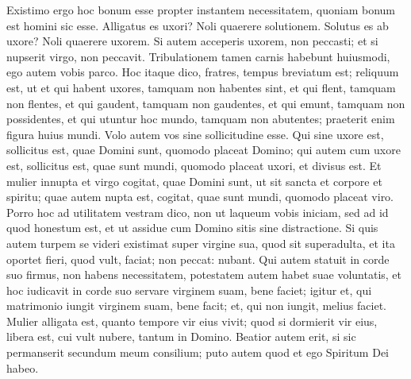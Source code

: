 \begin{biblechapter}
\verse Existimo ergo hoc bonum esse propter instantem necessitatem, quoniam bonum est homini sic esse. 
\verse Alligatus es uxori? Noli quaerere solutionem. Solutus es ab uxore? Noli quaerere uxorem. 
\verse Si autem acceperis uxorem, non peccasti; et si nupserit virgo, non peccavit. Tribulationem tamen carnis habebunt huiusmodi, ego autem vobis parco. 
\verse Hoc itaque dico, fratres, tempus breviatum est; reliquum est, ut et qui habent uxores, tamquam non habentes sint, 
\verse et qui flent, tamquam non flentes, et qui gaudent, tamquam non gaudentes, et qui emunt, tamquam non possidentes, 
\verse et qui utuntur hoc mundo, tamquam non abutentes; praeterit enim figura huius mundi. 
\verse Volo autem vos sine sollicitudine esse. Qui sine uxore est, sollicitus est, quae Domini sunt, quomodo placeat Domino; 
\verse qui autem cum uxore est, sollicitus est, quae sunt mundi, quomodo placeat uxori,  
\verse et divisus est. Et mulier innupta et virgo cogitat, quae Domini sunt, ut sit sancta et corpore et spiritu; quae autem nupta est, cogitat, quae sunt mundi, quomodo placeat viro. 
\verse Porro hoc ad utilitatem vestram dico, non ut laqueum vobis iniciam, sed ad id quod honestum est, et ut assidue cum Domino sitis sine distractione. 
\verse Si quis autem turpem se videri existimat super virgine sua, quod sit superadulta, et ita oportet fieri, quod vult, faciat; non peccat: nubant. 
\verse Qui autem statuit in corde suo firmus, non habens necessitatem, potestatem autem habet suae voluntatis, et hoc iudicavit in corde suo servare virginem suam, bene faciet; 
\verse igitur et, qui matrimonio iungit virginem suam, bene facit; et, qui non iungit, melius faciet. 
\verse Mulier alligata est, quanto tempore vir eius vivit; quod si dormierit vir eius, libera est, cui vult nubere, tantum in Domino. 
\verse Beatior autem erit, si sic permanserit secundum meum consilium; puto autem quod et ego Spiritum Dei habeo. 
\end{biblechapter}

